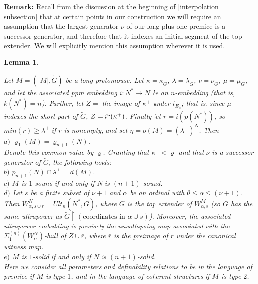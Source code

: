 \documentclass[12pt]{article}
\newtheorem{lem}[thm]{Lemma}
\begin{document}
\textbf{Remark:} Recall from the discussion at the beginning of \ref{interpolation subsection} that at certain points in our construction we will require an assumption that the largest generator $\nu$ of our long plus-one premice is a successor generator, and therefore that it indexes an initial segment of the top extender.  We will explicitly mention this assumption wherever it is used.\\

\begin{lem} \label{long finestructure computation}


Let $M = (|M| , \tilde{G})$ be a long protomouse.  Let $\kappa = \kappa_{\tilde{G}}$, $\lambda = \lambda_{\tilde{G}}$, $ \nu = \nu_{\tilde{G}}$, $\mu = \mu_{\tilde{G}}$, and let the associated ppm embedding $i: N^* \longrightarrow  N$ be an $n$-embedding (that is, $k(N^*) = n$).  Further, let $Z =$ the image of $\kappa^+$ under $i_{E_\mu}$; that is, since $\mu$ indexes the short part of $\tilde{G}$, $Z = i``(\kappa^+ )$.  Finally let $r =  i (p (N^* ))$, so $min(r) \geq \lambda^+$ if $r$ is nonempty, and set $\eta = o(M) = (\lambda^+)^N$.  Then\\

$a)$ $\varrho_1 (M) = \varrho_{n+1} (N)$.\\

Denote this common value by $\varrho$.  Granting that $\kappa^+ < \varrho$ and that $\nu$ is a successor generator of $\tilde{G}$, the following holds:\\

$b)$ $p_{n+1} (N) \cap \lambda^+ = d(M)$.\\

$c)$ $M$ is $1$-sound if and only if $N$ is $(n+1)$-sound.\\

$d)$ Let $s$ be a finite subset of $\nu + 1$ and $\alpha$ be an ordinal with $\theta \leq \alpha \leq (\nu + 1)$.  Then $W_{\alpha , s \cup r}^N = Ult_n (N^* , G )$, where $G$ is the top extender of $W_{\alpha , s}^M$ (so $G$ has the same ultrapower as $\tilde{G} \restriction ( \text{coordinates in } \alpha \cup s)$).  Moreover, the associated ultrapower embedding is precisely the uncollapsing map associated with the $\Sigma_1^{(n)} ( W_\alpha^N )$-hull of $Z \cup  \bar{r}$, where $\bar{r}$ is the preimage of $r$ under the canonical witness map.\\

$e)$ $M$ is $1$-solid if and only if $N$ is $(n+1 )$-solid.\\

Here we consider all parameters and definability relations to be in the language of premice if $M$ is type $1$, and in the language of coherent structures if $M$ is type $2$.

\end{lem}
\end{document}
